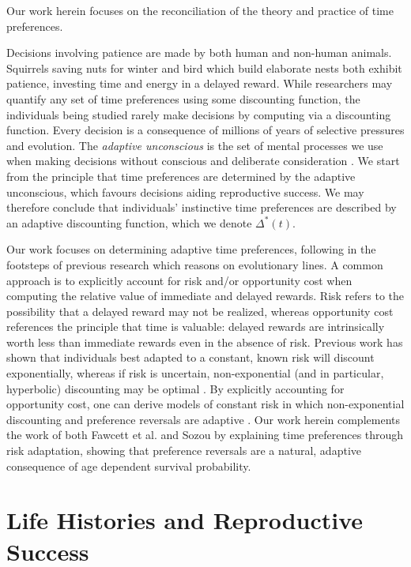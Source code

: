 \documentclass[titlepage, hidelinks, 12pt]{article}
\theoremstyle{plain}
\theoremstyle{remark}
\theoremstyle{definition}
\begin{document}
Our work herein focuses on the reconciliation of the theory and practice of time preferences. 

Decisions involving patience are made by both human and non-human animals. Squirrels saving nuts for winter and bird which build elaborate nests
both exhibit patience, investing time and energy in a delayed reward. While researchers may quantify any set of time preferences using
some discounting function, the individuals being studied rarely make decisions by computing via a discounting function. 
Every decision is a consequence of millions of years of selective pressures and evolution. The \textit{adaptive unconscious} is 
the set of mental processes we use when making decisions without conscious and deliberate consideration \cite{wegner02}. We start from the principle
that time preferences are determined by the adaptive unconscious,
which favours decisions aiding reproductive success. 
We may therefore conclude that individuals' instinctive time preferences are described by an adaptive discounting function, which we denote
$\Delta^*(t)$.



Our work focuses on determining adaptive time preferences, following in the footsteps of previous research which reasons on evolutionary
lines. A common approach is to explicitly account for risk and/or opportunity cost when computing the relative value of immediate and delayed
rewards. Risk refers to the possibility that a delayed reward may not be realized, whereas opportunity cost references the principle that
time is valuable: delayed rewards are intrinsically worth less than immediate rewards even in the absence of risk. 
Previous work has shown that individuals best adapted
to a constant, known risk will discount exponentially, whereas if risk is uncertain, non-exponential (and in particular,
hyperbolic) discounting may be optimal \cite{sozou98}. By explicitly accounting for opportunity cost, one can derive models of constant
risk in which non-exponential discounting and preference reversals are adaptive \cite{fawcett12}.
Our work herein complements the work of both Fawcett et al. and Sozou by 
explaining time preferences through risk adaptation, showing that preference reversals
are a natural, adaptive consequence of age dependent survival probability. 

\section{Life Histories and Reproductive Success}
\end{document}
